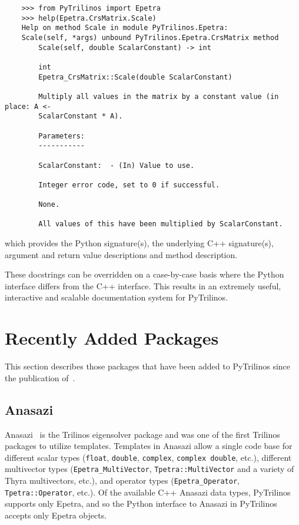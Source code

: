 \documentclass[11pt]{article}
\begin{document}
\begin{verbatim}
    >>> from PyTrilinos import Epetra
    >>> help(Epetra.CrsMatrix.Scale)
    Help on method Scale in module PyTrilinos.Epetra:
    Scale(self, *args) unbound PyTrilinos.Epetra.CrsMatrix method
        Scale(self, double ScalarConstant) -> int
    
        int
        Epetra_CrsMatrix::Scale(double ScalarConstant)

        Multiply all values in the matrix by a constant value (in place: A <-
        ScalarConstant * A).

        Parameters:
        -----------

        ScalarConstant:  - (In) Value to use.

        Integer error code, set to 0 if successful.

        None.

        All values of this have been multiplied by ScalarConstant.
\end{verbatim}

which provides the Python signature(s), the underlying C++ signature(s), argument and return value descriptions and method description.

These docstrings can be overridden on a case-by-case basis where the Python interface differs from the C++ interface.  This results in an extremely useful, interactive and scalable documentation system for PyTrilinos.

\section{Recently Added Packages}
\label{sec:newpackages}

This section describes those packages that have been added to PyTrilinos since the publication of~\cite{PyTrilinos}.

\subsection{Anasazi}
\label{sec:anasazi}

Anasazi~\cite{Anasazi} is the Trilinos eigensolver package and was one of the first Trilinos packages to utilize templates.  Templates in Anasazi allow a single code base for different scalar types ({\tt float}, {\tt double}, {\tt complex}, {\tt complex double}, etc.), different multivector types ({\tt Epetra\_MultiVector}, {\tt Tpetra::MultiVector} and a variety of Thyra multivectors, etc.), and operator types ({\tt Epetra\_Operator}, {\tt Tpetra::Operator}, etc.).  Of the available C++ Anasazi data types, PyTrilinos supports only Epetra, and so the Python interface to Anasazi in PyTrilinos accepts only Epetra objects.
\end{document}
